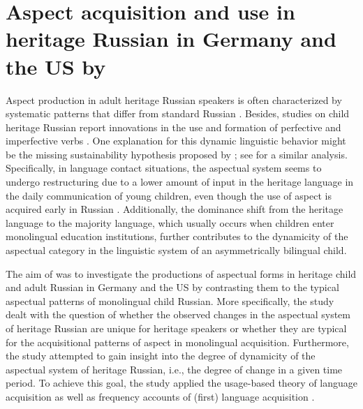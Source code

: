 \documentclass[output=paper,colorlinks,citecolor=brown]{langscibook}
\begin{document}
\section{Aspect acquisition and use in heritage Russian in Germany and the US by \textcite{gagarina2020first}} \label{study-on-Russian-aspect}

Aspect production in adult heritage Russian speakers is often characterized by systematic patterns that differ from standard Russian \parencite{pereltsvaig2004immigrant, laleko2008compositional}.
Besides, studies on child heritage Russian report innovations in the use and formation of perfective and imperfective verbs \parencite{gagarina2011acquisition, antonova2016aspect, kistanova2019acquisition}.
One explanation for this dynamic linguistic behavior might be the missing sustainability hypothesis proposed by \textcite{gagarina2020first}; see \textcite{swain1995problems} for a similar analysis.
Specifically, in language contact situations, the aspectual system seems to undergo restructuring due to a lower amount of input in the heritage language in the daily communication of young children, even though the use of aspect is acquired early in Russian \parencite{ceytlin2000jazyk, gagarina2008first, kistanova2019acquisition}. 
Additionally, the dominance shift from the heritage language to the majority language, which usually occurs when children enter monolingual education institutions, further contributes to the dynamicity of the aspectual category in the linguistic system of an asymmetrically bilingual child.

The aim of \textcite{gagarina2020first} was to investigate the productions of aspectual forms in heritage child and adult Russian in Germany and the US by contrasting them to the typical aspectual patterns of monolingual child Russian.
More specifically, the study dealt with the question of whether the observed changes in the aspectual system of heritage Russian are unique for heritage speakers or whether they are typical for the acquisitional patterns of aspect in monolingual acquisition.
Furthermore, the study attempted to gain insight into the degree of dynamicity of the aspectual system of heritage Russian, i.e., the degree of change in a given time period.
To achieve this goal, the study applied the usage-based theory of language acquisition \parencite{tomasello2005constructing} as well as frequency accounts of (first) language acquisition \parencite{gulzow2011frequency, lieven2010input}.
\end{document}

